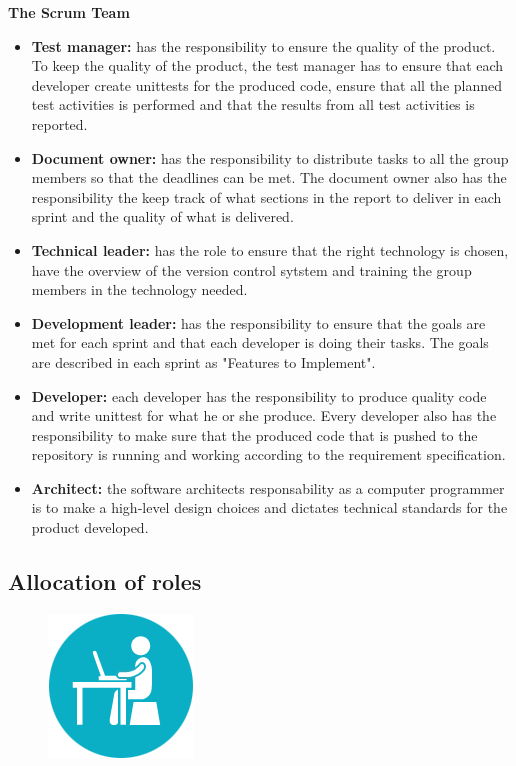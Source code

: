 \noindent
{\bf The Scrum Team}
\begin{itemize}

  \item {\bf Test manager:} has the responsibility to ensure the quality of the product. To keep the quality of the product, the test manager has to ensure that each developer create unittests for the produced code, ensure that all the planned test activities is performed and that the results from all test activities is reported.

  \item {\bf Document owner:} has the responsibility to distribute tasks to all the group members so that the deadlines can be met. The document owner also has the responsibility the keep track of what sections in the report to deliver in each sprint and the quality of what is delivered.

  \item {\bf Technical leader:} has the role to ensure that the right technology is chosen, have the overview of the version control sytstem and training the group members in the technology needed.

  \item {\bf Development leader:} has the responsibility to ensure that the goals are met for each sprint and that each developer is doing their tasks. The goals are described in each sprint as "Features to Implement". 

  \item {\bf Developer:} each developer has the responsibility to produce quality code and write unittest for what he or she produce. Every developer also has the responsibility to make sure that the produced code that is pushed to the repository is running and working according to the requirement specification.

  \item{\bf Architect:} the software architects responsability as a computer programmer is to make a high-level design choices and dictates technical standards for the product developed. \cite{architect}

  \end{itemize} 

\subsection{Allocation of roles}
\begin{figure}
  \begin{center}
  \includegraphics[scale=0.7]{pictures/Work.png}
  \end{center}
\end{figure}

